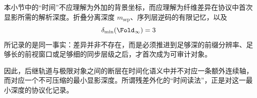 \begin{remark}\label{rem:frt-time-as-gap-depth}
本小节中的“时间”不应理解为外加的背景坐标，而应理解为纤维差异在协议中首次显影所需的解析深度。折叠分离深度 \(m_{\mathrm{sep}}\)、序列层逆码的有限记忆，以及
\[
\delta_{\min}(\Fold_\infty)=3
\]
所记录的是同一事实：差异并非不存在，而是必须推进到足够深的前缀分辨率、足够长的前视窗口或足够细的同步层级之后，才首次成为可审计对象。
\par
因此，后继轨道与极限对象之间的断层在时间化语义中并不对应一条额外连续轴，而对应一个不可压缩的最小显影深度。所谓残差外化的“时间读法”，正是对这一最小深度的协议化记录。
\end{remark}
